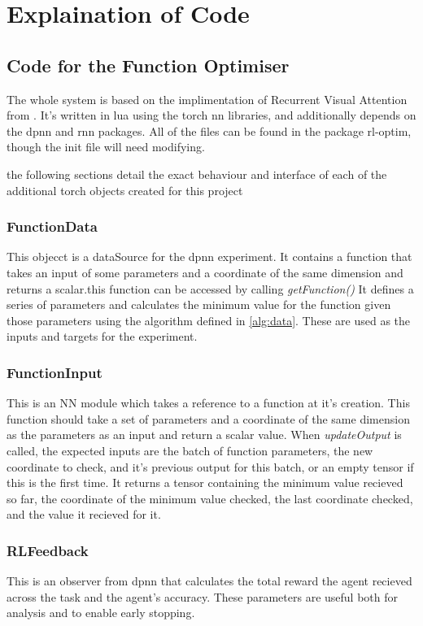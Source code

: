 \section{Explaination of Code}

\subsection{Code for the Function Optimiser}
The whole system is based on the implimentation of Recurrent Visual Attention from \cite{Torch:RVA}. It's written in lua using the torch nn libraries, and additionally depends on the dpnn and rnn packages. All of the files can be found in the package rl-optim, though the init file will need modifying.

the following sections detail the exact behaviour and interface of each of the additional torch objects created for this project
\subsubsection{FunctionData}
This objecct is a dataSource for the dpnn experiment. It contains a function that takes an input of some parameters and a coordinate of the same dimension and returns a scalar.this function can be accessed by calling \emph{getFunction()} It defines a series of parameters and calculates the minimum value for the function given those parameters using the algorithm defined in \ref{alg:data}. These are used as the inputs and targets for the experiment.

\subsubsection{FunctionInput}
This is an NN module which takes a reference to a function at it's creation. This function should take a set of parameters and a coordinate of the same dimension as the parameters as an input and return a scalar value. When \emph{updateOutput} is called, the expected inputs are the batch of function parameters, the new coordinate to check, and it's previous output for this batch, or an empty tensor if this is the first time. It returns a tensor containing the minimum value recieved so far, the coordinate of the minimum value checked, the last coordinate checked, and the value it recieved for it. 
\subsubsection{RLFeedback}
This is an observer from dpnn that calculates the total reward the agent recieved across the task and the agent's accuracy. These parameters are useful both for analysis and to enable early stopping.
